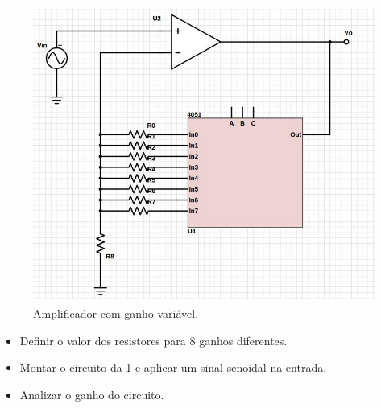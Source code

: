 \begin{figure}[H]
\begin{center}
\includegraphics[scale=.3]{Imagens/cir2.jpg}
\caption{Amplificador com ganho variável.}
\label{cir2}
\end{center}
\end{figure}

\begin{itemize}
 \item Definir o valor dos resistores para 8 ganhos diferentes.
 \item Montar o circuito da \ref{cir2} e aplicar um sinal senoidal na entrada.
 \item Analizar o ganho do circuito.
 \end{itemize} 